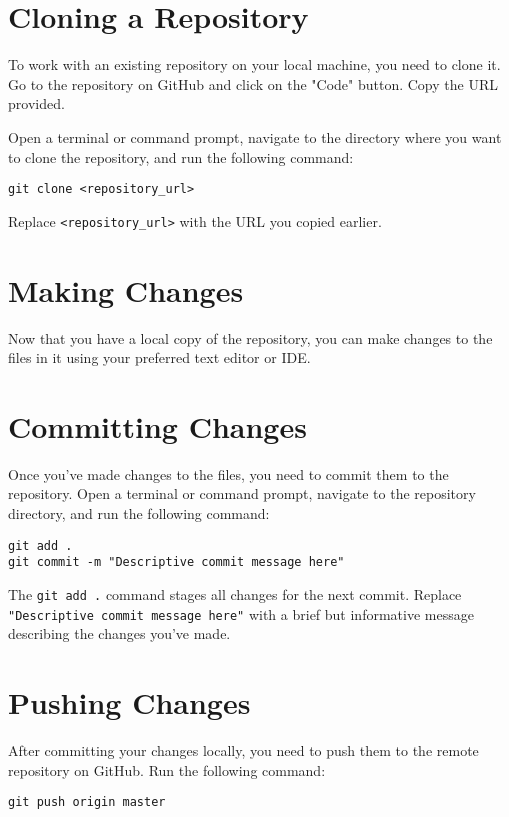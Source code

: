 \documentclass[10pt,twocolumn]{article}
\begin{document}
\section{Cloning a Repository}

To work with an existing repository on your local machine, you need to clone it. Go to the repository on GitHub and click on the "Code" button. Copy the URL provided.

Open a terminal or command prompt, navigate to the directory where you want to clone the repository, and run the following command:

\begin{verbatim}
git clone <repository_url>
\end{verbatim}

Replace \texttt{<repository\_url>} with the URL you copied earlier.

\section{Making Changes}

Now that you have a local copy of the repository, you can make changes to the files in it using your preferred text editor or IDE.

\section{Committing Changes}

Once you've made changes to the files, you need to commit them to the repository. Open a terminal or command prompt, navigate to the repository directory, and run the following command:

\begin{verbatim}
git add .
git commit -m "Descriptive commit message here"
\end{verbatim}

The \texttt{git add .} command stages all changes for the next commit. Replace \texttt{"Descriptive commit message here"} with a brief but informative message describing the changes you've made.

\section{Pushing Changes}

After committing your changes locally, you need to push them to the remote repository on GitHub. Run the following command:

\begin{verbatim}
git push origin master
\end{verbatim}
\end{document}
